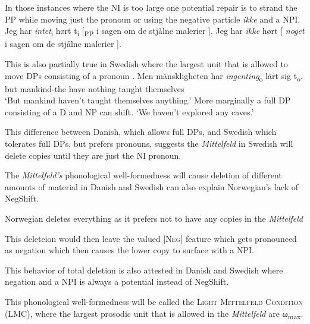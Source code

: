 \documentclass[12pt, letterpaper]{article}
\newcommand{\sub}[1]{\textsubscript{#1}}
\begin{document}
\ex In those instances where the NI is too large one potential repair is to strand the PP while moving just the pronoun or using the negative particle \textit{ikke} and a NPI.
	\ea Jeg har \textit{intet}\textsubscript{i} hørt t\textsubscript{i} [\textsubscript{PP} i sagen om de stjålne malerier ].
	\ex Jeg har \textit{ikke} hørt [ \textit{noget} i sagen om de stjålne malerier ].
	\z 
 
\ex This is also partially true in Swedish where the largest unit that is allowed to move DPs consisting of a pronoun \citep{penkaNegativeIndefinites2011}.
	\ea 
		\gll Men mänskligheten har \textit{ingenting}\textsubscript{o} lärt sig t\textsubscript{o}.\\
		but mankind-the have nothing taught themselves\\
		\glt `But mankind haven't taught themselves anything.'
	\z 
\ex More marginally a full DP consisting of a D and NP can shift. 
	\glt `We haven't explored any caves.'
	\z   	

\ex This difference between Danish, which allows full DPs, and Swedish which tolerates full DPs, but prefers pronouns, suggests the \emph{Mittelfeld} in Swedish will delete copies until they are just the NI pronoun. 

\ex The \emph{Mittelfeld's} phonological well-formedness will cause deletion of different amounts of material in Danish and Swedish can also explain Norwegian's lack of NegShift. 

	\ea Norwegian deletes everything as it prefers not to have any copies in the \emph{Mittelfeld}

	\ex This deleteion would then leave the valued [\textsc{Neg}] feature which gets pronounced as negation which then causes the lower copy to surface with a NPI.  

	\ex This behavior of total deletion is also attested in Danish and Swedish where negation and a NPI is always a potential instead of NegShift.
	\z 

\ex This phonological well-formedness will be called the \textsc{Light Mittelfeld Condition} (LMC), where the largest prosodic unit that is allowed in the \emph{Mittelfeld} are ω\sub{max}. 

\z 

\end{document}
